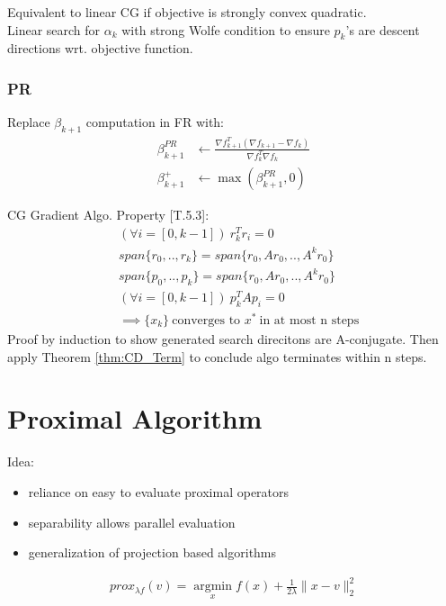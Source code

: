 \documentclass[8pt,letter]{article}
\DeclareMathOperator*{\argmin}{argmin}
\newcommand*{\argminl}{\argmin\limits}
\begin{document}
\begin{multicols*}{2}
  Equivalent to linear CG if objective is strongly convex quadratic.\\

  Linear search for $\alpha_k$ with strong Wolfe condition to ensure $p_k$'s are descent directions wrt. objective function.\\
  
  \subsubsection{PR}
  Replace $\beta_{k+1}$ computation in FR with:
  \begin{align*}
    \beta_{k+1}^{PR} & \leftarrow \frac{\nabla f_{k+1}^T (\nabla f_{k+1} - \nabla f_k)}{\nabla f_k^T \nabla f_k}\\
    \beta_{k+1}^+ & \leftarrow \max(\beta_{k+1}^{PR}, 0)
  \end{align*}


  CG Gradient Algo. Property [T.5.3]:
  \begin{align*}
    &(\forall i=[0,k-1])\ r_k^T r_i=0\\
    &span\{r_0,..,r_k\} = span\{r_0,Ar_0,..,A^kr_0\}\\
    &span\{p_0,..,p_k\} = span\{r_0,Ar_0,..,A^kr_0\}\\
    &(\forall i=[0,k-1])\ p_k^T A p_i = 0\\
    &\implies \{x_k\}\ \text{converges to } x^*\ \text{in at most n steps}    
  \end{align*}
  Proof by induction to show generated search direcitons are A-conjugate. Then apply Theorem \ref{thm:CD_Term} to conclude algo terminates within n steps.
  
  \vfill\null
  \columnbreak
  
  \section{Proximal Algorithm}
  Idea:
  \begin{itemize}
  \item reliance on easy to evaluate proximal operators
  \item separability allows parallel evaluation
  \item generalization of projection based algorithms
  \end{itemize}

  \begin{align*}
    prox_{\lambda f}(v) = \argminl_{x} f(x) + \frac{1}{2 \lambda} \|x-v\|_2^2
  \end{align*}


\end{multicols*}
\end{document}
